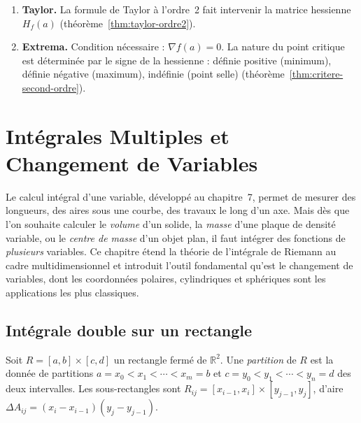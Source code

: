 \documentclass[12pt,a4paper,openany]{book}
\theoremstyle{definition}
\newcommand{\R}{\mathbb{R}}
\begin{document}
\begin{tcolorbox}
\begin{enumerate}[label=\textbf{\arabic*.}, leftmargin=2em]
  \item \textbf{Taylor.} La formule de Taylor à l'ordre~2 fait intervenir la matrice hessienne $H_f(a)$ (théorème~\ref{thm:taylor-ordre2}).

  \item \textbf{Extrema.} Condition nécessaire : $\nabla f(a) = 0$. La nature du point critique est déterminée par le signe de la hessienne : définie positive (minimum), définie négative (maximum), indéfinie (point selle) (théorème~\ref{thm:critere-second-ordre}).
\end{enumerate}
\end{tcolorbox}%

\chapter{Intégrales Multiples et Changement de Variables}
\label{chap:integrales-multiples}


Le calcul intégral d'une variable, développé au chapitre~7, permet de
mesurer des longueurs, des aires sous une courbe, des travaux le long
d'un axe. Mais dès que l'on souhaite calculer le \emph{volume} d'un
solide, la \emph{masse} d'une plaque de densité variable, ou le
\emph{centre de masse} d'un objet plan, il faut intégrer des fonctions
de \emph{plusieurs} variables. Ce chapitre étend la théorie de l'intégrale
de Riemann au cadre multidimensionnel et introduit l'outil fondamental
qu'est le changement de variables, dont les coordonnées polaires,
cylindriques et sphériques sont les applications les plus classiques.


\section{Intégrale double sur un rectangle}
\label{sec:integrale-double-rectangle}


Soit $R = [a,b]\times[c,d]$ un rectangle fermé de $\R^2$. Une
\emph{partition} de $R$ est la donnée
de partitions $a = x_0 < x_1 < \cdots < x_m = b$ et
$c = y_0 < y_1 < \cdots < y_n = d$ des deux intervalles. Les
sous-rectangles sont
$R_{ij} = [x_{i-1}, x_i]\times[y_{j-1}, y_j]$, d'aire
$\Delta A_{ij} = (x_i - x_{i-1})(y_j - y_{j-1})$.
\end{document}
